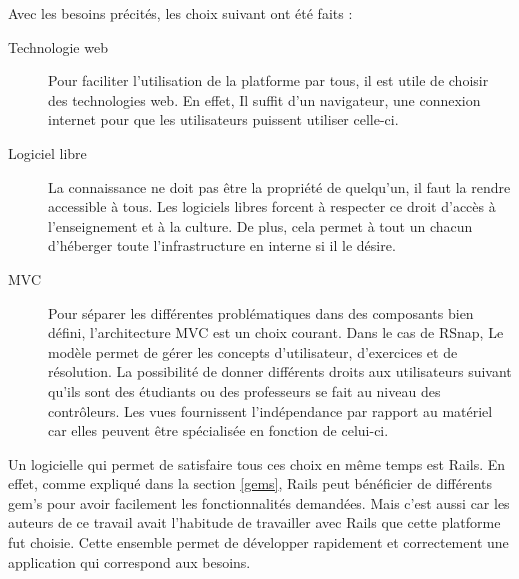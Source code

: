Avec les besoins précités, les choix suivant ont été faits :
\begin{description}
  \item[Technologie web] Pour faciliter l'utilisation de la platforme par tous, il est utile de choisir des technologies web. En effet, Il suffit d'un navigateur, une connexion internet pour que les utilisateurs puissent utiliser celle-ci.
  \item[Logiciel libre] La connaissance ne doit pas être la propriété de quelqu'un, il faut la rendre accessible à tous. Les logiciels libres forcent à respecter ce droit d'accès à l'enseignement et à la culture. De plus, cela permet à tout un chacun d'héberger toute l'infrastructure en interne si il le désire.
  \item[MVC] Pour séparer les différentes problématiques dans des composants bien défini, l'architecture MVC est un choix courant. Dans le cas de RSnap, Le modèle permet de gérer les concepts d'utilisateur, d'exercices et de résolution. La possibilité de donner différents droits aux utilisateurs suivant qu'ils sont des étudiants ou des professeurs se fait au niveau des contrôleurs. Les vues fournissent l'indépendance par rapport au matériel car elles peuvent être spécialisée en fonction de celui-ci.
\end{description}
Un logicielle qui permet de satisfaire tous ces choix en même temps est Rails. %
En effet, comme expliqué dans la section \ref{gems}, Rails peut bénéficier de différents gem's pour avoir facilement les fonctionnalités demandées. Mais c'est aussi car les auteurs de ce travail avait l'habitude de travailler avec Rails que cette platforme fut choisie. Cette ensemble permet de développer rapidement et correctement une application qui correspond aux besoins. 


